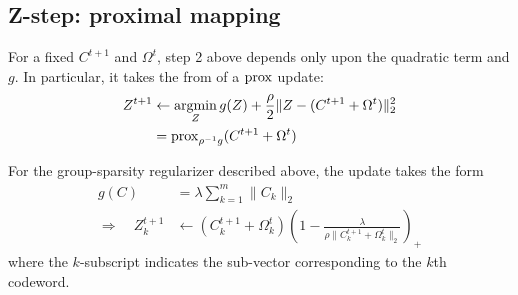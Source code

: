 \documentclass{article}
\begin{document}

\subsection{Z-step: proximal mapping}
For a fixed $C^{t+1}$ and $\Omega^t$, step 2 above depends only upon the quadratic term and $g$.  In
particular, it takes the from of a $\operatorname{prox}$ update:
\begin{align}
Z^{t+1} &\leftarrow \operatorname*{argmin}_Z g(Z) + \frac{\rho}{2} \|Z - (C^{t+1} + \Omega^t)\|_2^2 \label{eq:zstep}\\
        &= \operatorname{prox}_{\rho^{-1}g}(C^{t+1} + \Omega^t)
\end{align}

For the group-sparsity regularizer described above, the update takes the form
\begin{align*}
g(C) &= \lambda \sum_{k=1}^m \|C_k\|_2\\
\Rightarrow \quad Z_k^{t+1} &\leftarrow (C_k^{t+1} + \Omega_k^t) 
\left(1 - \frac{\lambda}{\rho \|C_k^{t+1} + \Omega^t_k\|_2}\right)_+
\end{align*}
where the $k$-subscript indicates the sub-vector corresponding to the $k$th codeword.
\end{document}
